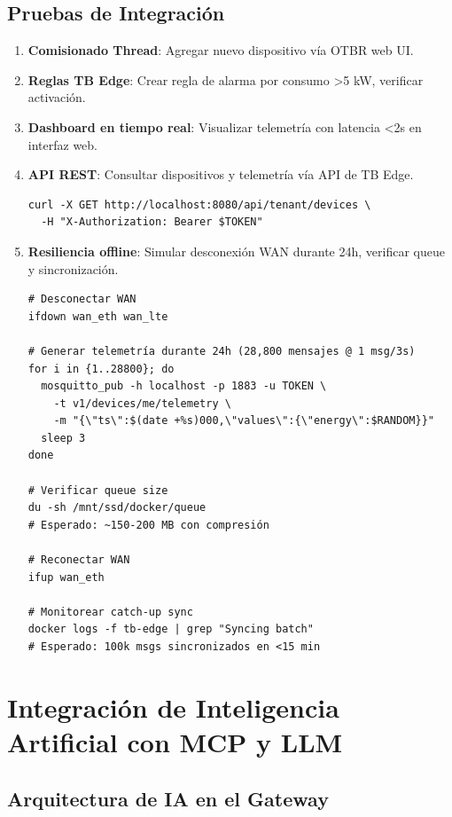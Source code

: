 \subsection{Pruebas de Integración}

\begin{enumerate}
    \item \textbf{Comisionado Thread}: Agregar nuevo dispositivo vía OTBR web UI.
    \item \textbf{Reglas TB Edge}: Crear regla de alarma por consumo >5 kW, verificar activación.
    \item \textbf{Dashboard en tiempo real}: Visualizar telemetría con latencia <2s en interfaz web.
    \item \textbf{API REST}: Consultar dispositivos y telemetría vía API de TB Edge.
    \begin{verbatim}
curl -X GET http://localhost:8080/api/tenant/devices \
  -H "X-Authorization: Bearer $TOKEN"
    \end{verbatim}
    
    \item \textbf{Resiliencia offline}: Simular desconexión WAN durante 24h, verificar queue y sincronización.
    \begin{verbatim}
# Desconectar WAN
ifdown wan_eth wan_lte

# Generar telemetría durante 24h (28,800 mensajes @ 1 msg/3s)
for i in {1..28800}; do
  mosquitto_pub -h localhost -p 1883 -u TOKEN \
    -t v1/devices/me/telemetry \
    -m "{\"ts\":$(date +%s)000,\"values\":{\"energy\":$RANDOM}}"
  sleep 3
done

# Verificar queue size
du -sh /mnt/ssd/docker/queue
# Esperado: ~150-200 MB con compresión

# Reconectar WAN
ifup wan_eth

# Monitorear catch-up sync
docker logs -f tb-edge | grep "Syncing batch"
# Esperado: 100k msgs sincronizados en <15 min
    \end{verbatim}
\end{enumerate}

\section{Integración de Inteligencia Artificial con MCP y LLM}

\subsection{Arquitectura de IA en el Gateway}

